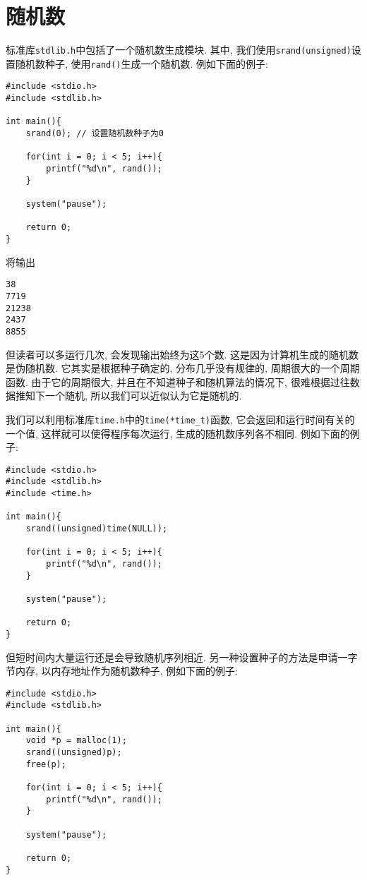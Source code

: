     \section{随机数}
        标准库\texttt{stdlib.h}中包括了一个随机数生成模块. 其中, 我们使用\texttt{srand(unsigned)}设置随机数种子, 使用\texttt{rand()}生成一个随机数. 例如下面的例子:
\begin{lstlisting}
#include <stdio.h>
#include <stdlib.h>

int main(){
    srand(0); // 设置随机数种子为0

    for(int i = 0; i < 5; i++){
        printf("%d\n", rand());
    }

    system("pause");

    return 0;
}
\end{lstlisting}
        将输出
\begin{lstlisting}
38
7719
21238
2437
8855
\end{lstlisting}

        但读者可以多运行几次, 会发现输出始终为这5个数. 这是因为计算机生成的随机数是伪随机数. 它其实是根据种子确定的, 分布几乎没有规律的, 周期很大的一个周期函数. 由于它的周期很大, 并且在不知道种子和随机算法的情况下, 很难根据过往数据推知下一个随机, 所以我们可以近似认为它是随机的.

        我们可以利用标准库\texttt{time.h}中的\texttt{time(*time\_t)}函数, 它会返回和运行时间有关的一个值, 这样就可以使得程序每次运行, 生成的随机数序列各不相同. 例如下面的例子:
\begin{lstlisting}
#include <stdio.h>
#include <stdlib.h>
#include <time.h>

int main(){
    srand((unsigned)time(NULL));

    for(int i = 0; i < 5; i++){
        printf("%d\n", rand());
    }

    system("pause");

    return 0;
}
\end{lstlisting}

        但短时间内大量运行还是会导致随机序列相近. 另一种设置种子的方法是申请一字节内存, 以内存地址作为随机数种子. 例如下面的例子:
\begin{lstlisting}
#include <stdio.h>
#include <stdlib.h>

int main(){
    void *p = malloc(1);
    srand((unsigned)p);
    free(p);

    for(int i = 0; i < 5; i++){
        printf("%d\n", rand());
    }

    system("pause");

    return 0;
}
\end{lstlisting}

